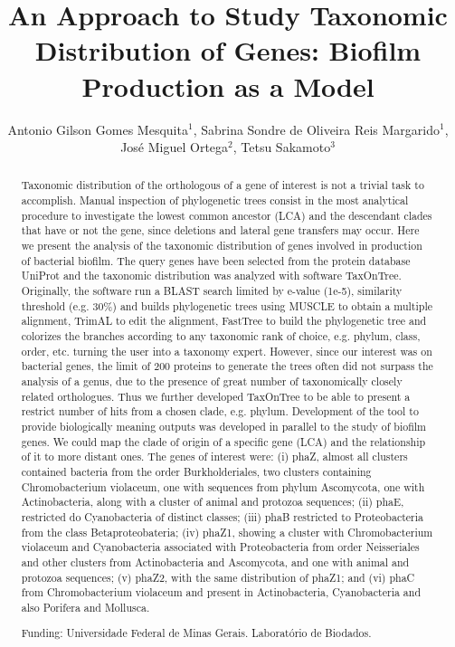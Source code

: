 \documentclass[twoside]{article}
\title{\vspace{-15mm}\fontsize{24pt}{10pt}\selectfont\textbf{An Approach to Study Taxonomic Distribution of Genes: Biofilm Production as a Model}} %
\author{Antonio Gilson Gomes Mesquita$^1$, Sabrina Sondre de Oliveira Reis Margarido$^1$, Jos\'e Miguel Ortega$^2$, Tetsu Sakamoto$^3$}
\affil{1 UNIVERSIDADE FEDERAL DO ACRE, LABGENMOL\\ 2 UFMG, LABORAT\'ORIO DE BIODADOS\\ 3 UFMG. LABORAT\'ORIO DE BIODADOS\\ }
\date{}
\begin{document}
\maketitle %

\thispagestyle{fancy} %


\begin{abstract}
Taxonomic distribution of the orthologous of a gene of interest is not a trivial task to accomplish. Manual inspection of phylogenetic trees consist in the most analytical procedure to investigate the lowest common ancestor (LCA) and the descendant clades that have or not the gene, since deletions and lateral gene transfers may occur. Here we present the analysis of the taxonomic distribution of genes involved in production of bacterial biofilm. The query genes have been selected from the protein database UniProt and the taxonomic distribution was analyzed with software TaxOnTree. Originally, the software run a BLAST search limited by e-value (1e-5), similarity threshold (e.g. 30\%) and builds phylogenetic trees using MUSCLE to obtain a multiple alignment, TrimAL to edit the alignment, FastTree to build the phylogenetic tree and colorizes the branches according to any taxonomic rank of choice, e.g. phylum, class, order, etc. turning the user into a taxonomy expert. However, since our interest was on bacterial genes, the limit of 200 proteins to generate the trees often did not surpass the analysis of a genus, due to the presence of great number of taxonomically closely related orthologues. Thus we further developed TaxOnTree to be able to present a restrict number of hits from a chosen clade, e.g. phylum. Development of the tool to provide biologically meaning outputs was developed in parallel to the study of biofilm genes. We could map the clade of origin of a specific gene (LCA) and the relationship of it to more distant ones. The genes of interest were: (i) phaZ, almost all clusters contained bacteria from the order Burkholderiales, two clusters containing Chromobacterium violaceum, one with sequences from phylum Ascomycota, one with Actinobacteria, along with a cluster of animal and protozoa sequences; (ii) phaE, restricted do Cyanobacteria of distinct classes; (iii) phaB restricted to Proteobacteria from the class Betaproteobateria; (iv) phaZ1, showing a cluster with Chromobacterium violaceum and Cyanobacteria associated with Proteobacteria from order Neisseriales and other clusters from Actinobacteria and Ascomycota, and one with animal and protozoa sequences; (v) phaZ2, with the same distribution of phaZ1; and (vi) phaC from Chromobacterium violaceum and present in Actinobacteria, Cyanobacteria and also Porifera and Mollusca.

Funding: Universidade Federal de Minas Gerais. Laborat\'orio de Biodados.
\end{abstract}
\end{document}
